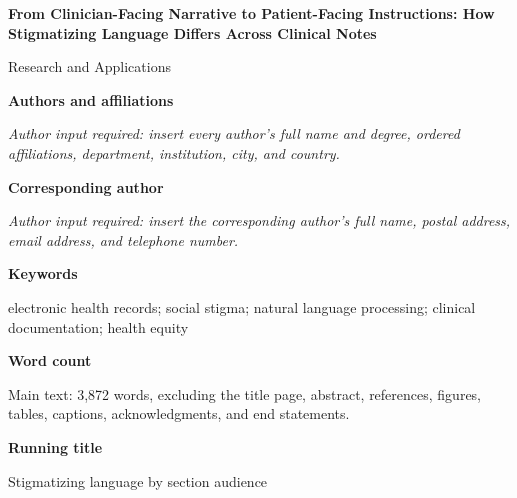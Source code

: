 \documentclass[12pt]{article}
\begin{document}
\doublespacing

\begin{center}
{\Large\bfseries From Clinician-Facing Narrative to Patient-Facing Instructions: How Stigmatizing Language Differs Across Clinical Notes\par}

\vspace{1.5em}
{\large Research and Applications\par}
\end{center}

\vspace{2em}
\noindent\textbf{Authors and affiliations}

\noindent\textit{Author input required: insert every author's full name and degree, ordered affiliations, department, institution, city, and country.}

\vspace{1.5em}
\noindent\textbf{Corresponding author}

\noindent\textit{Author input required: insert the corresponding author's full name, postal address, email address, and telephone number.}

\vspace{1.5em}
\noindent\textbf{Keywords}

\noindent electronic health records; social stigma; natural language processing; clinical documentation; health equity

\vspace{1.5em}
\noindent\textbf{Word count}

\noindent Main text: 3,872 words, excluding the title page, abstract, references, figures, tables, captions, acknowledgments, and end statements.

\vspace{1.5em}
\noindent\textbf{Running title}

\noindent Stigmatizing language by section audience
\end{document}

